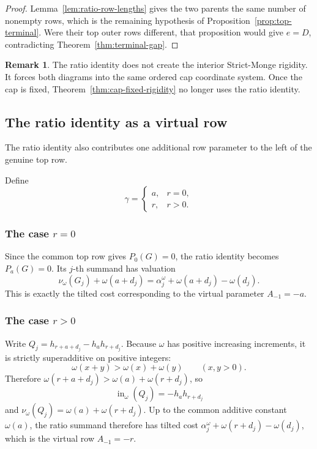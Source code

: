 \documentclass[11pt,a4paper]{amsart}
\numberwithin{equation}{section}
\theoremstyle{plain}
\theoremstyle{definition}
\newtheorem{remark}[theorem]{Remark}
\newcommand{\wto}{\nu_{\omega}}
\newcommand{\inin}{\operatorname{in}}
\begin{document}
\begin{proof}
Lemma~\ref{lem:ratio-row-lengths} gives the two parents the same number of nonempty rows, which is the remaining hypothesis of Proposition~\ref{prop:top-terminal}.  Were their top outer rows different, that proposition would give \(e=D\), contradicting Theorem~\ref{thm:terminal-gap}.
\end{proof}

\begin{remark}
The ratio identity does not create the interior Strict-Monge rigidity.  It forces both diagrams into the same ordered cap coordinate system.  Once the cap is fixed, Theorem~\ref{thm:cap-fixed-rigidity} no longer uses the ratio identity.
\end{remark}

\subsection{The ratio identity as a virtual row}\label{subsec:virtual}

The ratio identity also contributes one additional row parameter to the left of the genuine top row.

Define
\begin{equation}\label{eq:gamma}
\gamma=
\begin{cases}
 a,&r=0,\\
 r,&r>0.
\end{cases}
\end{equation}

\subsubsection{The case \(r=0\)}

Since the common top row gives \(P_0(G)=0\),
the ratio identity becomes \(P_a(G)=0\).
Its \(j\)-th summand has valuation
\[
\wto(G_j)+\omega(a+d_j)
=
\alpha_j^\omega+\omega(a+d_j)-\omega(d_j).
\]
This is exactly the tilted cost corresponding to the virtual parameter \(A_{-1}=-a\).

\subsubsection{The case \(r>0\)}

Write \(Q_j=h_{r+a+d_j}-h_a h_{r+d_j}\).
Because \(\omega\) has positive increasing increments, it is strictly superadditive on positive integers:
\[
\omega(x+y)>\omega(x)+\omega(y)
\qquad(x,y>0).
\]
Therefore \(\omega(r+a+d_j) > \omega(a)+\omega(r+d_j)\),
so
\[
\inin_{\omega}(Q_j)=-h_a h_{r+d_j}
\]
and \(\wto(Q_j)=\omega(a)+\omega(r+d_j)\).
Up to the common additive constant \(\omega(a)\), the ratio summand therefore has tilted cost \(\alpha_j^\omega+\omega(r+d_j)-\omega(d_j)\),
which is the virtual row \(A_{-1}=-r\).
\end{document}

